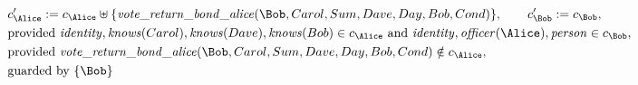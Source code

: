 \begin{align*}
&
c'_
{
\Alice
}
 := 
c_
{
\Alice
}
 \uplus 
\{
\mathit{\detokenize{
vote_return_bond_alice
}}
(
\Bob
,
Carol
,
Sum
,
Dave
,
Day
,
Bob
,
Cond
)
\}
, \qquad 
c'_
{
\Bob
}
 := 
c_
{
\Bob
}
,\\
&
\text{provided } 
\mathit{\detokenize{
identity
}}
,
\mathit{\detokenize{
knows
}}
(
Carol
)
,
\mathit{\detokenize{
knows
}}
(
Dave
)
,
\mathit{\detokenize{
knows
}}
(
Bob
)
 \in c_
{
\Alice
}
 \text{ and } 
\mathit{\detokenize{
identity
}}
,
\mathit{\detokenize{
officer
}}
(
\Alice
)
,
\mathit{\detokenize{
person
}}
 \in c_
{
\Bob
}
,\\
&
\text{provided } 
\mathit{\detokenize{
vote_return_bond_alice
}}
(
\Bob
,
Carol
,
Sum
,
Dave
,
Day
,
Bob
,
Cond
)
 \notin c_
{
\Alice
}
,\\
&
\text{guarded by } \{
\Bob
\}
\end{align*}

